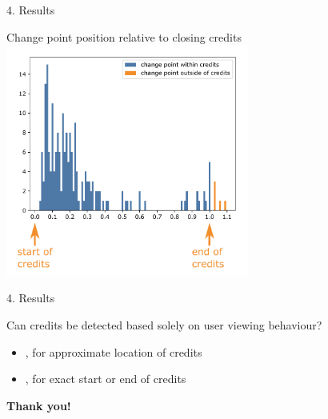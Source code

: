 \documentclass[first=orange,second=blue,logo=blueque]{aaltoslides}
\begin{document}
\begin{frame}{4. Results}
    \begin{block}{{\color{black}Change point position relative to closing credits}}
        \includegraphics[width=0.6\textwidth]{figures/result_relative1.pdf}
    \end{block}
\end{frame}


\begin{frame}{4. Results}
    \begin{block}{{\color{black}Can credits be detected based solely on user viewing behaviour?}}
        \begin{itemize}
            \item {\color{aaltoorange}{Yes}}, for approximate location of credits
            \item {\color{aaltoorange}{No}}, for exact start or end of credits
        \end{itemize}
    \end{block}
\end{frame}


\begin{frame}{}
    \center
    \bfseries \Huge \color{aaltoorange} Thank you!
\end{frame}
\end{document}
